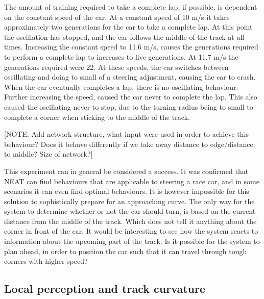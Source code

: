 The amount of training required to take a complete lap, if possible, is dependent on the constant speed of the car. At a constant speed of 10 m/s it takes approximately two generations for the car to take a complete lap. At this point the oscillation has stopped, and the car follows the middle of the track at all times. Increasing the constant speed to 11.6 m/s, causes the generations required to perform a complete lap to increases to five generations. At 11.7 m/s the generations required were 22. At these speeds, the car switches between oscillating and doing to small of a steering adjustment, causing the car to crash. When the car eventually completes a lap, there is no oscillating behaviour. Further increasing the speed, caused the car never to complete the lap. This also caused the oscillating never to stop, due to the turning radius being to small to complete a corner when sticking to the middle of the track.

[NOTE: Add network structure, what input were used in order to achieve this behaviour? Does it behave differently if we take away distance to edge/distance to middle? Size of network?]

This experiment can in general be considered a success. It was confirmed that NEAT can find behaviours that are applicable to steering a race car, and in some scenarios it can even find optimal behaviours. It is however impossible for this solution to sophistically prepare for an approaching curve. The only way for the system to determine whether or not the car should turn, is based on the current distance from the middle of the track. Which does not tell it anything about the corner in front of the car. It would be interesting to see how the system reacts to information about the upcoming part of the track. Is it possible for the system to plan ahead, in order to position the car such that it can travel through tough corners with higher speed?

\subsection{Local perception and track curvature}
\label{subsec:fixedspeedcurvature}



